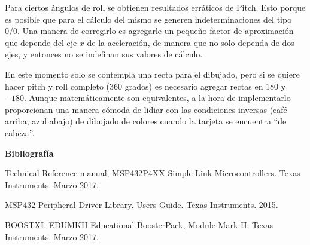 Para ciertos ángulos de roll se obtienen resultados erráticos de Pitch. Esto
porque es posible que para el cálculo del mismo se generen indeterminaciones del
tipo $0/0$. Una manera de corregirlo es agregarle un pequeño factor de
aproximación que depende del eje $x$ de la aceleración, de manera que no solo
dependa de dos ejes, y entonces no se indefinan sus valores de cálculo.

En este momento solo se contempla una recta para el dibujado, pero si se quiere
hacer pitch y roll completo ($360$ grados) es necesario agregar rectas en $180$
y $-180$. Aunque matemáticamente son equivalentes, a la hora de implementarlo
proporcionan una manera cómoda de lidiar con las condiciones inversas (café
arriba, azul abajo) de dibujado de colores cuando la tarjeta se encuentra ``de
cabeza''.


\textbf{ Bibliografía}

Technical Reference manual, MSP432P4XX Simple Link Microcontrollers. Texas Instruments. Marzo 2017.

MSP432 Peripheral Driver Library. Users Guide. Texas Instruments. 2015.

BOOSTXL-EDUMKII Educational BoosterPack, Module Mark II. Texas Instruments. Marzo 2017.


%
%
